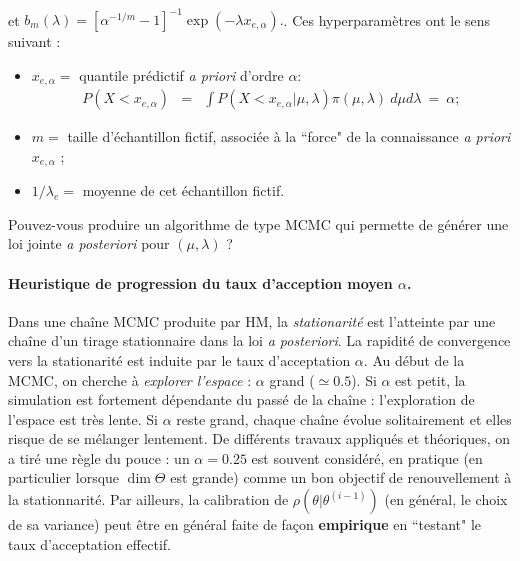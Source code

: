 \begin{exec}
\begin{enumerate}
\begin{eqnarray*}
\end{eqnarray*}
et ${\displaystyle b_m(\lambda)  = \left[\alpha^{-1/m}
-1\right]^{-1} \exp(-\lambda x_{e,\alpha}).}$. Ces hyperparamètres ont le sens suivant :
\begin{itemize}
\item $x_{e,\alpha}=$ quantile prédictif {\it a priori} d'ordre $\alpha$:
\begin{eqnarray*}
P\left(X<x_{e,\alpha}\right) & = & \int P\left(X<x_{e,\alpha}|\mu,\lambda\right)  \pi(\mu,\lambda) \ d\mu d\lambda \ = \ \alpha ; 
\end{eqnarray*}  
\item $m =$ taille d'échantillon fictif, associée à la ``force" de la connaissance {\it a priori} $x_{e,\alpha}$ ; 
\item $1/\lambda_e = $ moyenne de cet échantillon  fictif. 
\end{itemize}
Pouvez-vous produire un algorithme de type MCMC qui permette de générer une loi jointe {\it a posteriori} pour $(\mu,\lambda)$ ? 
\end{enumerate}
\end{exec}

\if{} \vspace{1cm} 
\fi

\paragraph{Heuristique de progression du taux d'acception moyen $\alpha$.} Dans une chaîne MCMC produite par HM, la \emph{stationarité} est l'atteinte par une chaîne d'un tirage stationnaire dans la loi {\it a posteriori}. La rapidité de convergence vers la stationarité est induite par le taux d'acceptation $\alpha$. Au début de la MCMC, on cherche à \emph{explorer l'espace} : $\alpha$ grand ($\simeq 0.5$). Si $\alpha$ est petit, la simulation est fortement dépendante du passé de la chaîne : l'exploration de l'espace est très lente. Si $\alpha$ reste grand, chaque chaîne évolue solitairement et elles risque de se mélanger lentement. De différents travaux appliqués et théoriques, on a tiré une règle du pouce : un $\alpha=0.25$ est souvent considéré, en pratique (en particulier lorsque $\dim\Theta$ est grande) comme 
un bon objectif de renouvellement à la stationnarité. Par ailleurs, la calibration de $\rho(\theta|\theta^{(i-1)})$ (en général, le choix de sa variance) peut être en général faite de façon {\bf empirique} en ``testant" le taux d'acceptation effectif. \\

